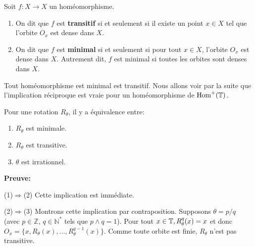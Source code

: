 \begin{definition}
		Soit $f: X \to X$ un homéomorphisme.
		\begin{enumerate}
			\item On dit que $f$ est \textbf{transitif} si et seulement si il existe un point $x \in X$ tel que l'orbite $O_x$ est dense dans $X$.
			\item	On dit que $f$ est \textbf{minimal} si et seulement si pour tout $x \in X$, l'orbite $O_x$ est dense dans $X$. Autrement dit, $f$ est minimal si toutes les orbites sont denses dans $X$.
		\end{enumerate}
\end{definition}









\begin{rmq}
Tout homéomorphisme est minimal est transitif. Nous allons voir par la suite que l'implication réciproque est vraie pour un homéomorphisme de $\mathrm{Hom}^+({\mathbb{T}})$.
\end{rmq}




\begin{example}\label{exemple rot}
	Pour une rotation $R_\theta$, il y a équivalence entre:
	\begin{enumerate}
		\item $R_{\theta}$ est minimale.
		\item $R_{\theta}$ est transitive.
		\item $\theta$ est irrationnel.
	\end{enumerate}
\end{example}

\textbf{Preuve:}
	\par (1)$\Rightarrow$(2) Cette implication est immédiate.\\

	\par(2)$\Rightarrow$(3) Montrons cette implication par contraposition. Supposons $\theta = p/q$ (avec $p\in \mathbb{Z}$, $q \in \mathbb{N}^*$ tels que $p \wedge q =1$). Pour tout $x \in {\mathbb{T}}, R_{\theta}^q(x)=x$ et donc $O_x = \lbrace x, R_{\theta}(x),...,R_{\theta}^{q-1}(x) \rbrace$. Comme toute orbite est finie, $R_{\theta}$ n'est pas transitive.\\

